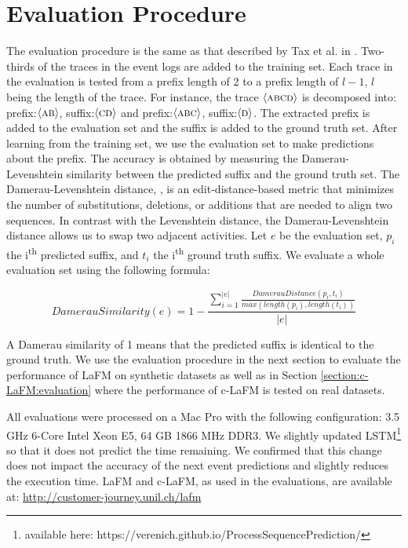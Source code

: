 \documentclass[runningheads]{llncs}
\begin{document}
\section{Evaluation Procedure} \label{section:evalationProcedure}
The evaluation procedure is the same as that described by Tax et al. in \cite{tax2017predictive}. Two-thirds of the traces in the event logs are added to the training set. Each trace in the evaluation is tested from a prefix length of 2 to a prefix length of $l - 1$, $l$ being the length of the trace. For instance, the trace $\langle \textsc{abcd} \rangle$ is decomposed into: prefix:$\langle \textsc{ab} \rangle$, suffix:$\langle \textsc{cd} \rangle$ and prefix:$\langle \textsc{abc} \rangle$, suffix:$\langle \textsc{d} \rangle$. The extracted prefix is added to the evaluation set and the suffix is added to the ground truth set. After learning from the training set, we use the evaluation set to make predictions about the prefix. The accuracy is obtained by measuring the Damerau-Levenshtein similarity between the predicted suffix and the ground truth set. The Damerau-Levenshtein distance, \cite{damerau1964technique}, is an edit-distance-based metric that minimizes the number of substitutions, deletions, or additions that are needed to align two sequences. In contrast with the Levenshtein distance, the Damerau-Levenshtein distance allows us to swap two adjacent activities. Let $e$ be the evaluation set, $p_i$ the i\textsuperscript{th} predicted suffix, and $t_i$ the i\textsuperscript{th} ground truth suffix. We evaluate a whole evaluation set using the following formula:

\begin{equation}
	DamerauSimilarity(e) = 1- \frac{\sum_{i=1}^{|e|}{\frac{DamerauDistance(p_i,t_i)}{max(length(p_i),length(t_i))}}}{|e|}
\end{equation}

A Damerau similarity of 1 means that the predicted suffix is identical to the ground truth. We use the evaluation procedure in the next section to evaluate the performance of LaFM on synthetic datasets as well as in Section \ref{section:c-LaFM:evaluation} where the performance of c-LaFM is tested on real datasets. 

All evaluations were processed on a Mac Pro with the following configuration: 3.5 GHz 6-Core Intel Xeon E5, 64 GB 1866 MHz DDR3. We slightly updated LSTM\footnote{available here: https://verenich.github.io/ProcessSequencePrediction/} so that it does not predict the time remaining. We confirmed that this change does not impact the accuracy of the next event predictions and slightly reduces the execution time. LaFM and c-LaFM, as used in the evaluations, are available at: \url{http://customer-journey.unil.ch/lafm}
\end{document}
